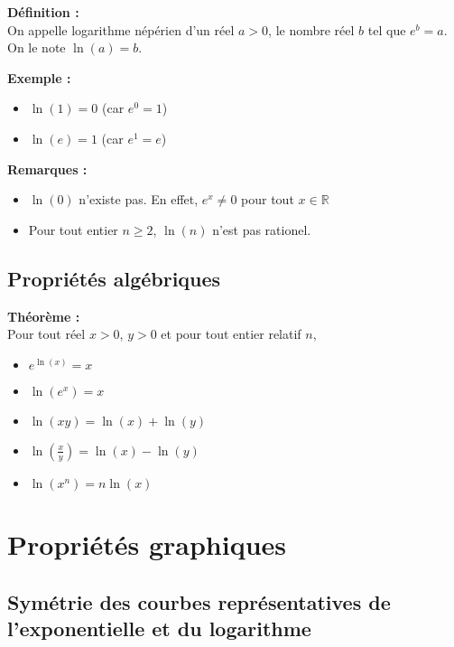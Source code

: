 \documentclass[11pt,a4paper]{article}
\begin{document}
\begin{mdframed}[style=definitionStyle]
    \textbf{Définition :} ~\\
    On appelle logarithme népérien d'un réel $a>0$, le nombre réel $b$ tel que $e^b=a$.\\
    On le note $\ln(a)=b$. 
\end{mdframed}

\textbf{Exemple :}
\vspace{-4pt}
\begin{itemize}
    \item $\ln(1) = 0$ (car $e^0=1$)
    \item $\ln(e) = 1$ (car $e^1=e$)
\end{itemize}

\textbf{Remarques :}
\vspace{-4pt}
\begin{itemize}
    \item $\ln(0)$ n'existe pas. En effet, $e^x\not=0$ pour tout $x\in\mathbb{R}$
    \item Pour tout entier $n\geq 2$, $\ln(n)$ n'est pas rationel.
\end{itemize} 

\subsection{Propriétés algébriques}

\begin{mdframed}[style=proprieteStyle]
    \textbf{Théorème :} ~\\
    Pour tout réel $x>0$, $y>0$ et pour tout entier relatif $n$,
    \vspace{-4pt}
    \begin{itemize}
        \item $e^{\ln(x)}=x$
        \item $\ln(e^x)=x$
        \item $\ln(xy) = \ln(x) + \ln(y)$
        \item $\ln(\frac{x}{y}) = \ln(x) - \ln(y)$
        \item $\ln(x^n)=n\ln(x)$
    \end{itemize}
\end{mdframed}

\section{Propriétés graphiques}

\subsection{Symétrie des courbes représentatives de l'exponentielle et du logarithme}
\end{document}
